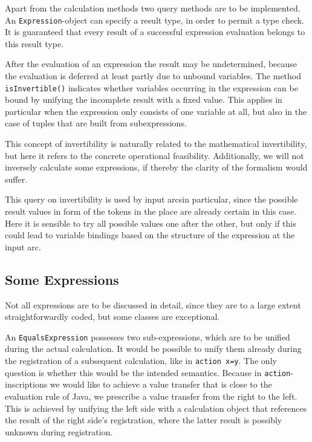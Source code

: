 Apart from the calculation methods two query methods are to be
implemented. An \texttt{Expression}-object can specify a result type,
in order to permit a type check.
It is guaranteed that every result of a successful
expression evaluation belongs to this result type.

After the evaluation of an expression the result may be undetermined,
because the evaluation is deferred at least partly due to unbound variables. 
The method \texttt{isInvertible()} indicates whether
variables occurring in the expression
can be bound by unifying the incomplete result with a
fixed value. This applies in particular when the
expression only consists of one variable at all, but also in the case
of tuples that are built from subexpressions.

This concept of invertibility is naturally related to the mathematical
invertibility, but here it refers to the concrete operational feasibility.
Additionally, we will not inversely calculate some expressions, if thereby
the clarity of the formalism would suffer.

This query on invertibility is used  by input arcsin particular, since the
possible result values in form of the tokens in the place are already
certain in this case. Here it is sensible to try all possible values one after
the other, but only if this could lead to variable bindings
based on the structure of the expression at the input arc.


\subsection{Some Expressions}

Not all expressions are to be discussed in detail, since they are to a
large extent straightforwardly coded, but some classes are exceptional.

An \texttt{EqualsExpression} possesses two sub-expressions, which are
to be unified during the actual calculation.
It would be possible to unify them already during the
registration of a subsequent calculation, like in
\texttt{action x=y}. The only question is whether this would be the intended
semantics. Because in \texttt{action}-inscriptions 
we would like to achieve a value transfer that is close to 
the evaluation rule of Java,  we prescribe a value transfer from the
right to the left. This is achieved by unifying the left side with 
a calculation object that references the result of the right side's
registration, where the latter result is possibly unknown
during registration.

